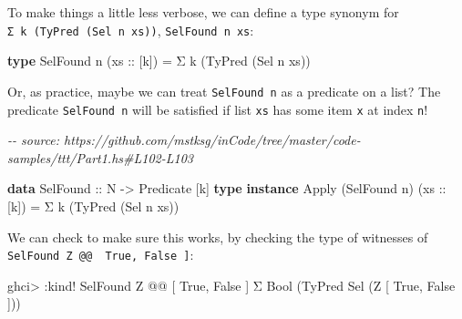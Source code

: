 \documentclass[]{article}
\newenvironment{Shaded}{}{}
\newcommand{\CommentTok}[1]{\textcolor[rgb]{0.38,0.63,0.69}{\textit{#1}}}
\newcommand{\DataTypeTok}[1]{\textcolor[rgb]{0.56,0.13,0.00}{#1}}
\newcommand{\KeywordTok}[1]{\textcolor[rgb]{0.00,0.44,0.13}{\textbf{#1}}}
\newcommand{\NormalTok}[1]{#1}
\newcommand{\OperatorTok}[1]{\textcolor[rgb]{0.40,0.40,0.40}{#1}}
\newcommand{\OtherTok}[1]{\textcolor[rgb]{0.00,0.44,0.13}{#1}}
\begin{document}
To make things a little less verbose, we can define a type synonym for
\texttt{Σ\ k\ (TyPred\ (Sel\ n\ xs))}, \texttt{SelFound\ n\ xs}:

\begin{Shaded}
\begin{Highlighting}[]
\KeywordTok{type} \DataTypeTok{SelFound}\NormalTok{ n (}\OtherTok{xs ::}\NormalTok{ [k]) }\OtherTok{=}\NormalTok{ Σ k (}\DataTypeTok{TyPred}\NormalTok{ (}\DataTypeTok{Sel}\NormalTok{ n xs))}
\end{Highlighting}
\end{Shaded}

Or, as practice, maybe we can treat \texttt{SelFound\ n} as a predicate on a
list? The predicate \texttt{SelFound\ n} will be satisfied if list \texttt{xs}
has some item \texttt{x} at index \texttt{n}!

\begin{Shaded}
\begin{Highlighting}[]
\CommentTok{{-}{-} source: https://github.com/mstksg/inCode/tree/master/code{-}samples/ttt/Part1.hs\#L102{-}L103}

\KeywordTok{data} \DataTypeTok{SelFound}\OtherTok{ ::} \DataTypeTok{N} \OtherTok{{-}\textgreater{}} \DataTypeTok{Predicate}\NormalTok{ [k]}
\KeywordTok{type} \KeywordTok{instance} \DataTypeTok{Apply}\NormalTok{ (}\DataTypeTok{SelFound}\NormalTok{ n) (}\OtherTok{xs ::}\NormalTok{ [k]) }\OtherTok{=}\NormalTok{ Σ k (}\DataTypeTok{TyPred}\NormalTok{ (}\DataTypeTok{Sel}\NormalTok{ n xs))}
\end{Highlighting}
\end{Shaded}

We can check to make sure this works, by checking the type of witnesses of
\texttt{SelFound\ \textquotesingle{}Z\ @@\ \textquotesingle{}{[}\ \textquotesingle{}True,\ \textquotesingle{}False\ {]}}:

\begin{Shaded}
\begin{Highlighting}[]
\NormalTok{ghci}\OperatorTok{\textgreater{}} \OperatorTok{:}\NormalTok{kind}\OperatorTok{!} \DataTypeTok{SelFound} \DataTypeTok{\textquotesingle{}Z} \OperatorTok{@@}\NormalTok{ \textquotesingle{}[ }\DataTypeTok{\textquotesingle{}True}\NormalTok{, }\DataTypeTok{\textquotesingle{}False}\NormalTok{ ]}
\NormalTok{Σ }\DataTypeTok{Bool}\NormalTok{ (}\DataTypeTok{TyPred} \DataTypeTok{Sel}\NormalTok{ (}\DataTypeTok{\textquotesingle{}Z}\NormalTok{ \textquotesingle{}[ }\DataTypeTok{\textquotesingle{}True}\NormalTok{, }\DataTypeTok{\textquotesingle{}False}\NormalTok{ ]))}
\end{Highlighting}
\end{Shaded}
\end{document}
